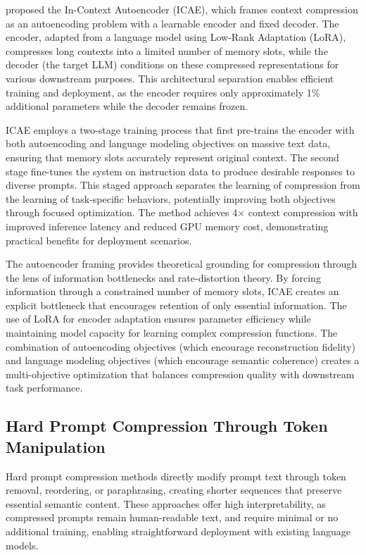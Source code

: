 \documentclass[11pt,letterpaper]{article}
\begin{document}
\cite{ge2024icae} proposed the In-Context Autoencoder (ICAE), which frames context compression as an autoencoding problem with a learnable encoder and fixed decoder. The encoder, adapted from a language model using Low-Rank Adaptation (LoRA), compresses long contexts into a limited number of memory slots, while the decoder (the target LLM) conditions on these compressed representations for various downstream purposes. This architectural separation enables efficient training and deployment, as the encoder requires only approximately 1\% additional parameters while the decoder remains frozen.

ICAE employs a two-stage training process that first pre-trains the encoder with both autoencoding and language modeling objectives on massive text data, ensuring that memory slots accurately represent original context. The second stage fine-tunes the system on instruction data to produce desirable responses to diverse prompts. This staged approach separates the learning of compression from the learning of task-specific behaviors, potentially improving both objectives through focused optimization. The method achieves 4$\times$ context compression with improved inference latency and reduced GPU memory cost, demonstrating practical benefits for deployment scenarios.

The autoencoder framing provides theoretical grounding for compression through the lens of information bottlenecks and rate-distortion theory. By forcing information through a constrained number of memory slots, ICAE creates an explicit bottleneck that encourages retention of only essential information. The use of LoRA for encoder adaptation ensures parameter efficiency while maintaining model capacity for learning complex compression functions. The combination of autoencoding objectives (which encourage reconstruction fidelity) and language modeling objectives (which encourage semantic coherence) creates a multi-objective optimization that balances compression quality with downstream task performance.

\subsection{Hard Prompt Compression Through Token Manipulation}

Hard prompt compression methods directly modify prompt text through token removal, reordering, or paraphrasing, creating shorter sequences that preserve essential semantic content. These approaches offer high interpretability, as compressed prompts remain human-readable text, and require minimal or no additional training, enabling straightforward deployment with existing language models.
\end{document}
